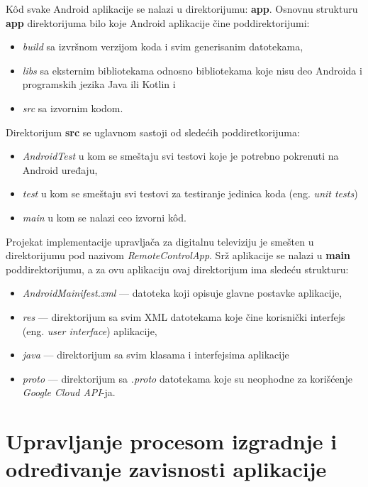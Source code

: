 \documentclass[implementacija.tex]{subfiles}
\begin{document}
K\^{o}d svake Android aplikacije se nalazi u direktorijumu: \textbf{app}. Osnovnu strukturu \textbf{app} direktorijuma bilo koje Android aplikacije čine poddirektorijumi: 

\begin{itemize}
\item \textit{build} sa izvršnom verzijom koda i svim generisanim datotekama,
\item \textit{libs} sa eksternim bibliotekama odnosno bibliotekama koje nisu deo Androida i programskih jezika Java ili Kotlin i
\item \textit{src} sa izvornim kodom.
\end{itemize}

 Direktorijum \textbf{src} se uglavnom sastoji od sledećih poddiretkorijuma: 
\begin{itemize}
\item \textit{AndroidTest} u kom se smeštaju svi testovi koje je potrebno pokrenuti na Android uređaju, 
\item \textit{test} u kom se smeštaju svi testovi za testiranje jedinica koda (eng. \textit{unit tests})
\item \textit{main} u kom se nalazi ceo izvorni k\^{o}d.
\end{itemize}

Projekat implementacije upravljača za digitalnu televiziju je smešten u direktorijumu pod nazivom \textit{RemoteControlApp}. Srž aplikacije se nalazi u \textbf{main} poddirektorijumu, a za ovu aplikaciju ovaj direktorijum ima sledeću strukturu:
\begin{itemize}
\item \textit{AndroidMainifest.xml} --- datoteka koji opisuje glavne postavke aplikacije,
\item \textit{res} --- direktorijum sa svim XML datotekama koje čine korisnički interfejs (eng. \textit{user interface}) aplikacije,
\item \textit{java} --- direktorijum sa svim klasama i interfejsima aplikacije
\item \textit{proto} --- direktorijum sa \textit{.proto} datotekama koje su neophodne za korišćenje \textit{Google Cloud API}-ja.
\end{itemize}

\section{Upravljanje procesom izgradnje i određivanje zavisnosti aplikacije}
\end{document}
